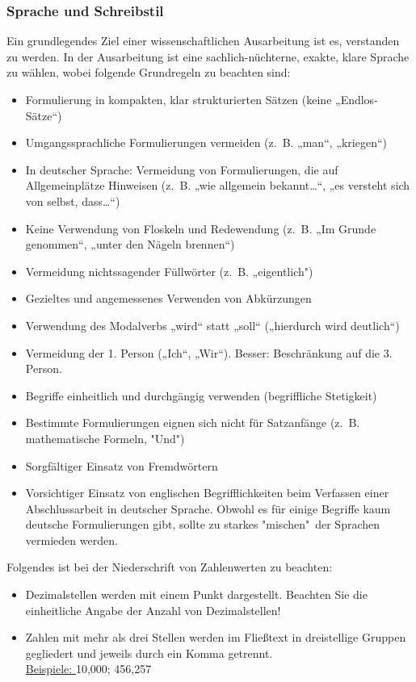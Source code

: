 \subsubsection{Sprache und Schreibstil}
Ein grundlegendes Ziel einer wissenschaftlichen Ausarbeitung ist es, verstanden zu werden. In der Ausarbeitung ist eine sachlich-nüchterne, exakte, klare Sprache zu wählen, wobei folgende Grundregeln zu beachten sind:
\begin{itemize}
    \item Formulierung in kompakten, klar strukturierten Sätzen (keine „Endlos-Sätze“)
    \item Umgangssprachliche Formulierungen vermeiden (z.~B. „man“, „kriegen“)
    \item In deutscher Sprache: Vermeidung von Formulierungen, die auf Allgemeinplätze Hinweisen (z.~B. „wie allgemein bekannt…“, „es versteht sich von selbst, dass…“)
    \item Keine Verwendung von Floskeln und Redewendung (z.~B. „Im Grunde genommen“, „unter den Nägeln brennen“)
    \item Vermeidung nichtssagender Füllwörter (z.~B. „eigentlich")
    \item Gezieltes und angemessenes Verwenden von Abkürzungen 
    \item Verwendung des Modalverbs „wird“ statt „soll“ („hierdurch wird deutlich“)
    \item Vermeidung der 1. Person („Ich“, „Wir“). Besser: Beschränkung auf die 3. Person.
    \item Begriffe einheitlich und durchgängig verwenden (begriffliche Stetigkeit)
    \item Bestimmte Formulierungen eignen sich nicht für Satzanfänge (z.~B. mathematische Formeln, "Und")
    \item Sorgfältiger Einsatz von Fremdwörtern
    \item Vorsichtiger Einsatz von englischen Begrifflichkeiten beim Verfassen einer Abschlussarbeit in deutscher Sprache. Obwohl es für einige Begriffe kaum deutsche Formulierungen gibt, sollte zu starkes "mischen"\ der Sprachen vermieden werden.
\end{itemize}

Folgendes ist bei der Niederschrift von Zahlenwerten zu beachten: 
\begin{itemize}
    \item Dezimalstellen werden mit einem Punkt dargestellt. Beachten Sie die einheitliche Angabe der Anzahl von Dezimalstellen!
    \item Zahlen mit mehr als drei Stellen werden im Fließtext in dreistellige Gruppen gegliedert und jeweils durch ein Komma getrennt.\\
    \uline{Beispiele: } 10,000; 456,257
\end{itemize}

